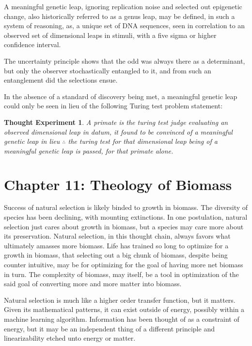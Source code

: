 \documentclass[ebook,12pt,oneside,openany]{memoir}
\newtheorem*{thoughtexperiment}{Thought Experiment} %
\begin{document}
\indent A meaningful genetic leap, ignoring replication noise and selected out epigenetic change, also historically referred to as a genus leap, may be defined, in such a system of reasoning, as, a unique set of DNA sequences, seen in correlation to an observed set of dimensional leaps in stimuli, with a five sigma or higher confidence interval.

\indent The uncertainty principle shows that the odd was always there as a determinant, but only the observer stochastically entangled to it, and from such an entanglement did the selections ensue.

\indent In the absence of a standard of discovery being met, a meaningful genetic leap could only be seen in lieu of the following Turing test problem statement:

\indent \begin{thoughtexperiment}
A primate is the turing test judge evaluating an observed dimensional leap in datum, it found to be convinced of a meaningful genetic leap in lieu $\therefore$ the turing test for that dimensional leap being of a meaningful genetic leap is passed, for that primate alone.
\end{thoughtexperiment}
\chapter*{Chapter 11: Theology of Biomass}


\indent \indent Success of natural selection is likely binded to growth in biomass. The diversity of species has been declining, with mounting extinctions. In one postulation, natural selection just cares about growth in biomass, but a species may care more about its preservation. Natural selection, in this thought chain, always favors what ultimately amasses more biomass. Life has trained so long to optimize for a growth in biomass, that selecting out a big chunk of biomass, despite being counter intuitive, may be for optimizing for the goal of having more net biomass in turn. The complexity of biomass, may itself, be a tool in optimization of the said goal of converting more and more matter into biomass.

\indent Natural selection is much like a higher order transfer function, but it matters. Given its mathematical patterns, it can exist outside of energy, possibly within a machine learning algorithm. Information has been thought of as a constraint of energy, but it may be an independent thing of a different principle and linearizability etched unto energy or matter.
\end{document}

